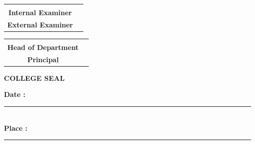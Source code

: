 \begin{center}
\begin{tabular}{cc}
\begin{minipage}{0.42\textwidth}
\centering
\rule{5cm}{0.2px}\\
\textbf{Internal Examiner}
\end{minipage}
&
\begin{minipage}{0.42\textwidth}
\centering
\rule{5cm}{0.2px}\\
\textbf{External Examiner}
\end{minipage}
\end{tabular}

\vspace{2.2cm}


\begin{tabular}{cc}
\begin{minipage}{0.42\textwidth}
\centering
\rule{5cm}{0.2px}\\
\textbf{Head of Department}
\end{minipage}
&
\begin{minipage}{0.42\textwidth}
\centering
\rule{5cm}{0.2px}\\
\textbf{Principal}
\end{minipage}
\end{tabular}

\vspace{1.5cm}


\textbf{COLLEGE SEAL}

\vspace{2cm}

\begin{flushleft}
\textbf{Date :} \rule{4cm}{0.2px}\\[0.4cm]
\textbf{Place :} \rule{4cm}{0.2px}
\end{flushleft}

\end{center}